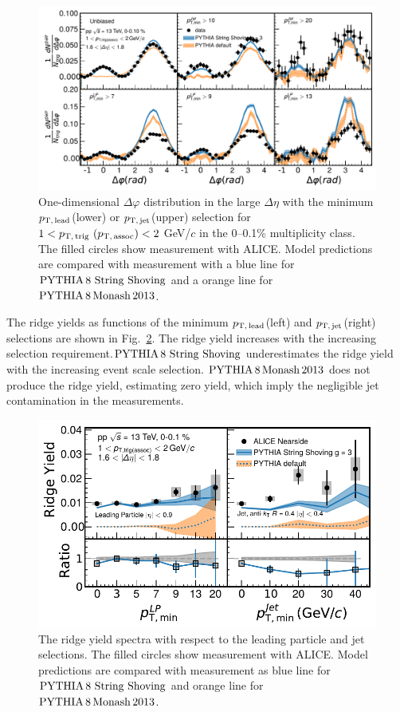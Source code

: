 \begin{figure}[h!]
	\centering
	\includegraphics[width=0.99\linewidth]{./figures/Fig5_PlotDeltaPhiESE.pdf}
	\caption{ One-dimensional $\Delta\varphi$ distribution in the large $\Delta\eta$ with the minimum $p_\mathrm{T,\,lead}$(lower) or $p_\mathrm{T,\,jet}$(upper) selection for $1< p_\mathrm{T,\,trig}~\mathrm (p_\mathrm{T,\,assoc}) <2$ GeV/$c$ in the 0--0.1\% multiplicity class. The filled circles show measurement with ALICE. Model predictions are compared with measurement with a blue line for $\mathrm{PYTHIA}\,8~\mathrm{String}~\mathrm{Shoving}$  and a orange line for $\mathrm{PYTHIA}\,8\,\mathrm{Monash}\,2013$.}
	\label{fig:PlotDeltaPhiESE}
\end{figure}

The ridge yields as functions of the minimum $p_\mathrm{T,\,lead}$(left) and $p_\mathrm{T,\,jet}$(right) selections are shown in Fig.~\ref{fig:RidgeYield_ESE}. The ridge yield increases with the increasing selection requirement.$\mathrm{PYTHIA}\,8~\mathrm{String}~\mathrm{Shoving}$ underestimates the ridge yield with the increasing event scale selection. $\mathrm{PYTHIA}\,8\,\mathrm{Monash}\,2013$ does not produce the ridge yield, estimating zero yield, which imply the negligible jet contamination in the measurements.

\begin{figure}[h!]
	\centering
	\includegraphics[width=0.99\linewidth]{./figures/Fig6_RidgeYieldESE.pdf}
	\caption{The ridge yield spectra with respect to the leading particle and jet selections. The filled circles show measurement with ALICE. Model predictions are compared with measurement as blue line for $\mathrm{PYTHIA}\,8~\mathrm{String}~\mathrm{Shoving}$ and orange line for $\mathrm{PYTHIA}\,8\,\mathrm{Monash}\,2013$.}
	\label{fig:RidgeYield_ESE}
\end{figure}



